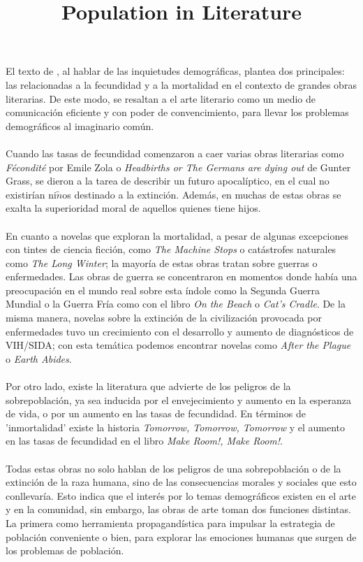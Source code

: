 \documentclass[11pt,spanish,letterpaper]{article}
\theoremstyle{plain}
\begin{document}
\title{Population in Literature}
\date{}
\maketitle
El texto de \cite{shriver2003population}, al hablar de las inquietudes demogr\'aficas, plantea dos principales: las relacionadas a la fecundidad y a la mortalidad en el contexto de grandes obras literarias. De este modo, se resaltan a el arte literario como un medio de comunicaci\'on eficiente y con poder de convencimiento, para llevar los problemas demogr\'aficos al imaginario com\'un.\\
\\ 
Cuando las tasas de fecundidad comenzaron a caer varias obras literarias como \textit{F\'econdit\'e} por Emile Zola o \textit{Headbirths or The Germans are dying out} de Gunter Grass, se dieron a la tarea de describir un futuro apocal\'iptico, en el cual no existir\'ian ni$\tilde{n}$os destinado a la extinci\'on. Adem\'as, en muchas de estas obras se exalta la superioridad moral de aquellos quienes tiene hijos.\\
\\
En cuanto a novelas que exploran la mortalidad, a pesar de algunas excepciones con tintes de ciencia ficci\'on, como \textit{The Machine Stops} o cat\'astrofes naturales como \textit{The Long Winter}; la mayor\'ia de estas obras tratan sobre guerras o enfermedades. Las obras de guerra se concentraron en momentos donde hab\'ia una preocupaci\'on en el mundo real sobre esta \'indole como la Segunda Guerra Mundial o la Guerra Fr\'ia como con el libro \textit{On the Beach} o \textit{Cat's Cradle}. De la misma manera, novelas sobre la extinci\'on de la civilizaci\'on provocada por enfermedades tuvo un crecimiento con el desarrollo y aumento de diagn\'osticos de VIH/SIDA; con esta tem\'atica podemos encontrar novelas como \textit{After the Plague} o \textit{Earth Abides}.\\
\\
Por otro lado, existe la literatura que advierte de los peligros de la sobrepoblaci\'on, ya sea inducida por el envejecimiento y aumento en la esperanza de vida, o por un aumento en las tasas de fecundidad. En t\'erminos de 'inmortalidad' existe la historia \textit{Tomorrow, Tomorrow, Tomorrow} y el aumento en las tasas de fecundidad en el libro \textit{Make Room!, Make Room!}.\\
\\
Todas estas obras no solo hablan de los peligros de una sobrepoblaci\'on o de la extinci\'on de la raza humana, sino de las consecuencias morales y sociales que esto conllevar\'ia. Esto indica que el inter\'es por lo temas demogr\'aficos existen en el arte y en la comunidad, sin embargo, las obras de arte toman dos funciones distintas. La primera como herramienta propagand\'istica para impulsar la estrategia de poblaci\'on conveniente o bien, para explorar las emociones humanas que surgen de los problemas de poblaci\'on.


\end{document}
